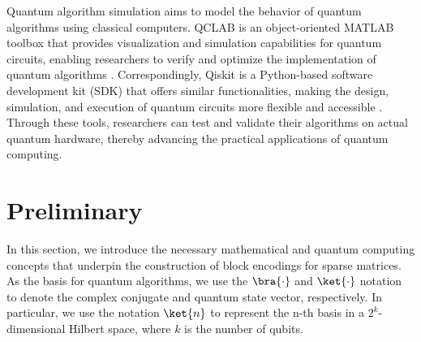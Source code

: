 \documentclass{article}
\begin{document}
    Quantum algorithm simulation aims to model the behavior of quantum algorithms using classical computers.
    QCLAB \cite{keip2025qclab} is an object-oriented MATLAB toolbox that provides visualization and simulation capabilities for quantum circuits, enabling researchers to verify and optimize the implementation of quantum algorithms .
    Correspondingly, Qiskit\cite{wille2019ibm} is a Python-based software development kit (SDK) that offers similar functionalities, making the design, simulation, and execution of quantum circuits more flexible and accessible .
    Through these tools, researchers can test and validate their algorithms on actual quantum hardware, thereby advancing the practical applications of quantum computing.


    \section{Preliminary}\label{sec:preliminary}
    In this section, we introduce the necessary mathematical and quantum computing concepts that underpin the construction of block encodings for sparse matrices.
    As the basis for quantum algorithms, we use the $\bra{\cdot}$ and $\ket{\cdot}$ notation to denote the complex conjugate and quantum state vector, respectively. In particular, we use the notation $\ket{n}$ to represent the n-th basis in a $2^k$-dimensional Hilbert space, where $k$ is the number of qubits.
\end{document}
